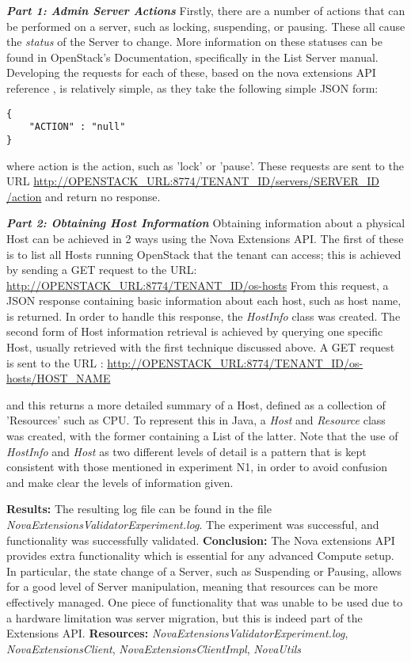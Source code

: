 \textbf{\textit{Part 1: Admin Server Actions}}
Firstly, there are a number of actions that can be performed on a server, such as locking, suspending, or pausing. These all cause the \textit{status} of the Server to change. More information on these statuses can be found in OpenStack's Documentation, specifically in the List Server manual\cite{osserverstatus}.
Developing the requests for each of these, based on the nova extensions API reference \cite{novaextref}, is relatively simple, as they take the following simple JSON form: 
\begin{verbatim}
{
	"ACTION" : "null"
}
\end{verbatim}
where action is the action, such as 'lock' or 'pause'. 
These requests are sent to the URL \url{http://OPENSTACK_URL:8774/​TENANT_ID​/servers/​SERVER_ID​/action} and return no response.

\textbf{\textit{Part 2: Obtaining Host Information}}
Obtaining information about a physical Host can be achieved in 2 ways using the Nova Extensions API. The first of these is to list all Hosts running OpenStack that the tenant can access; this is achieved by sending a GET request to the URL:
	\url{http://OPENSTACK_URL:8774/TENANT_ID/os-hosts}
From this request, a JSON response containing basic information about each host, such as host name, is returned. In order to handle this response, the \textit{HostInfo} class was created. 
The second form of Host information retrieval is achieved by querying one specific Host, usually retrieved with the first technique discussed above. A GET request is sent to the URL :
	\url{http://OPENSTACK_URL:8774/TENANT_ID/os-hosts/HOST_NAME}
	
and this returns a more detailed summary of a Host, defined as a collection of 'Resources' such as CPU. To represent this in Java, a \textit{Host} and \textit{Resource} class was created, with the former containing a List of the latter.  
Note that the use of \textit{HostInfo} and \textit{Host} as two different levels of detail is a pattern that is kept consistent with those mentioned in experiment N1, in order to avoid confusion and make clear the levels of information given. 

\textbf{Results:} The resulting log file can be found in the file \textit{NovaExtensionsValidatorExperiment.log}. The experiment was successful, and functionality was successfully validated. 
\textbf{Conclusion:} The Nova extensions API provides extra functionality which is essential for any advanced Compute setup. In particular, the state change of a Server, such as Suspending or Pausing, allows for a good level of Server manipulation, meaning that resources can be more effectively managed. One piece of functionality that was unable to be used due to a hardware limitation was server migration, but this is indeed part of the Extensions API. 
\textbf{Resources:}  \textit{NovaExtensionsValidatorExperiment.log}, \textit{NovaExtensionsClient}, \textit{NovaExtensionsClientImpl}, \textit{NovaUtils}

